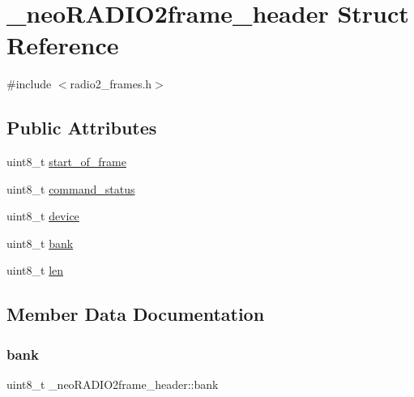 \hypertarget{struct__neo_r_a_d_i_o2frame__header}{}\section{\+\_\+neo\+R\+A\+D\+I\+O2frame\+\_\+header Struct Reference}
\label{struct__neo_r_a_d_i_o2frame__header}


{\ttfamily \#include $<$radio2\+\_\+frames.\+h$>$}

\subsection*{Public Attributes}
\begin{DoxyCompactItemize}
\item 
uint8\+\_\+t \mbox{\hyperlink{struct__neo_r_a_d_i_o2frame__header_a7aeb33b54573897247eb9e47d77d574b}{start\+\_\+of\+\_\+frame}}
\item 
uint8\+\_\+t \mbox{\hyperlink{struct__neo_r_a_d_i_o2frame__header_a9ac3b1a0a075c7e63ebbf2be90effd90}{command\+\_\+status}}
\item 
uint8\+\_\+t \mbox{\hyperlink{struct__neo_r_a_d_i_o2frame__header_aeefaa15286c39bce34fdbde55618ed76}{device}}
\item 
uint8\+\_\+t \mbox{\hyperlink{struct__neo_r_a_d_i_o2frame__header_a59e3ea9b739ff0076cd9708a1b882f10}{bank}}
\item 
uint8\+\_\+t \mbox{\hyperlink{struct__neo_r_a_d_i_o2frame__header_ae3486ad88240ed8a5a477a7d1e55b873}{len}}
\end{DoxyCompactItemize}


\subsection{Member Data Documentation}
\mbox{\label{struct__neo_r_a_d_i_o2frame__header_a59e3ea9b739ff0076cd9708a1b882f10}} 
\subsubsection{\texorpdfstring{bank}{bank}}
{\footnotesize\ttfamily uint8\+\_\+t \+\_\+neo\+R\+A\+D\+I\+O2frame\+\_\+header\+::bank}

